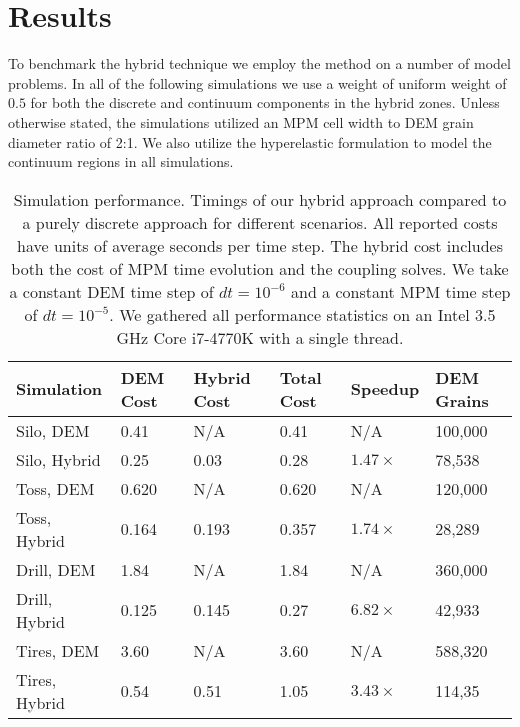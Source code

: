 \chapter{Results} \label{sec:results}
To benchmark the hybrid technique we employ the method on a number of model problems. In all of the following simulations we use a weight of uniform weight of $0.5$ for both the discrete and continuum components in the hybrid zones. Unless otherwise stated, the simulations utilized an MPM cell width to DEM grain diameter ratio of 2:1. We also utilize the hyperelastic formulation to model the continuum regions in all simulations. 

\begin{table}
  \begin{tabular}{llllll}
      \hline
      \textbf{Simulation} & \textbf{DEM Cost} & \textbf{Hybrid Cost} & \textbf{Total Cost} & \textbf{Speedup} & \textbf{DEM Grains}\\
      \hline
      Silo, DEM    & 0.41 & N/A & 0.41 & N/A  & 100,000\\
      Silo, Hybrid & 0.25 & 0.03 & 0.28 & $1.47\times$ & 78,538\\
      \hline
      Toss, DEM    & 0.620 & N/A & 0.620 & N/A  & 120,000\\
      Toss, Hybrid & 0.164 & 0.193 & 0.357 & $1.74\times$ & 28,289\\
      \hline
      Drill, DEM    & 1.84  & N/A  & 1.84  & N/A & 360,000\\
      Drill, Hybrid & 0.125 & 0.145 & 0.27 & $6.82\times$ & 42,933\\
      \hline
      Tires, DEM    & 3.60 & N/A & 3.60 & N/A  & 588,320\\
      Tires, Hybrid & 0.54 & 0.51 & 1.05 & $3.43\times$ & 114,35\\
      \hline
  \end{tabular}
  \vspace{0.2cm}
  \caption{Simulation performance. Timings of our hybrid approach compared to a purely discrete approach for different scenarios. All reported costs have units of average seconds per time step. The hybrid cost includes both the cost of MPM time evolution and the coupling solves. We take a constant DEM time step of $dt=10^{-6}$ and a constant MPM time step of $dt=10^{-5}$. We gathered all performance statistics on an Intel 3.5 GHz Core i7-4770K with a single thread.} \label{tbl:speedup}
\end{table}

